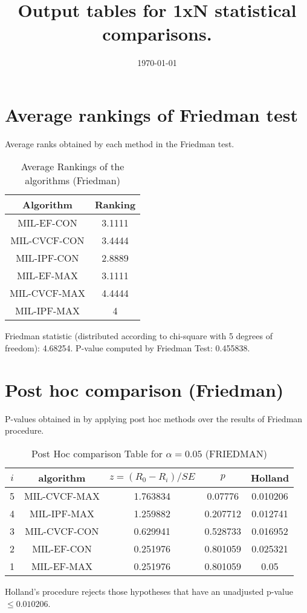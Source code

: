 \documentclass[a4paper,10pt]{article}
\title{Output tables for 1xN statistical comparisons.}
\author{}
\date{\today}
\begin{document}
\begin{landscape}
\pagestyle{empty}
\maketitle
\thispagestyle{empty}

\section{Average rankings of Friedman test}


Average ranks obtained by each method in the Friedman test.

\begin{table}[!htp]
\centering
\begin{tabular}{|c|c|}\hline
Algorithm&Ranking\\\hline
MIL-EF-CON&3.1111\\MIL-CVCF-CON&3.4444\\MIL-IPF-CON&2.8889\\MIL-EF-MAX&3.1111\\MIL-CVCF-MAX&4.4444\\MIL-IPF-MAX&4\\\hline\end{tabular}
\caption{Average Rankings of the algorithms (Friedman)}
\end{table}

Friedman statistic (distributed according to chi-square with 5 degrees of freedom): 4.68254. \newline P-value computed by Friedman Test: 0.455838.\newline


\newpage

\section{Post hoc comparison (Friedman)}


P-values obtained in by applying post hoc methods over the results of Friedman procedure.

\begin{table}[!htp]
\centering\footnotesize
\begin{tabular}{ccccc}
$i$&algorithm&$z=(R_0 - R_i)/SE$&$p$&Holland\\
\hline5&MIL-CVCF-MAX&1.763834&0.07776&0.010206\\4&MIL-IPF-MAX&1.259882&0.207712&0.012741\\3&MIL-CVCF-CON&0.629941&0.528733&0.016952\\2&MIL-EF-CON&0.251976&0.801059&0.025321\\1&MIL-EF-MAX&0.251976&0.801059&0.05\\\hline
\end{tabular}
\caption{Post Hoc comparison Table for $\alpha=0.05$ (FRIEDMAN)}
\end{table}Holland's procedure rejects those hypotheses that have an unadjusted p-value $\le0.010206$.



\end{landscape}
\end{document}
